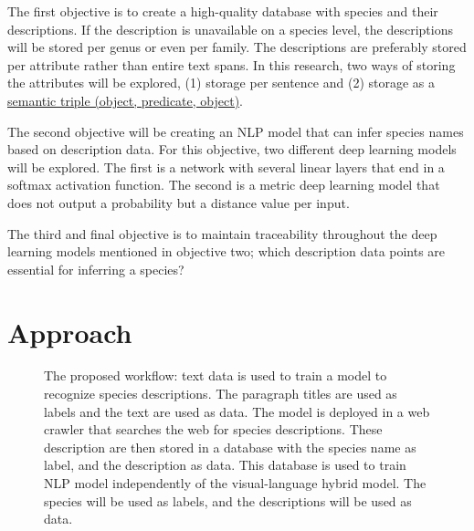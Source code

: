 \documentclass[a4paper, 12pt, oneside]{book} %
\begin{document}
The first objective is to create a high-quality database with species and their descriptions.
If the description is unavailable on a species level, the descriptions will be stored per genus or even per family.
The descriptions are preferably stored per attribute rather than entire text spans.
In this research, two ways of storing the attributes will be explored, (1) storage per sentence and (2) storage as a \href{https://www.ontotext.com/knowledgehub/fundamentals/what-is-a-knowledge-graph/}{semantic triple (object, predicate, object)}.

The second objective will be creating an NLP model that can infer species names based on description data. 
For this objective, two different deep learning models will be explored.
The first is a network with several linear layers that end in a softmax activation function.
The second is a metric deep learning model that does not output a probability but a distance value per input.

The third and final objective is to maintain traceability throughout the deep learning models mentioned in objective two; which description data points are essential for inferring a species?
\section{Approach} 
\thispagestyle{empty} %

\begin{figure} [t]
    \centering
    \vspace{-2cm}
    \caption{The proposed workflow: text data is used to train a model to recognize species descriptions. The paragraph titles are used as labels and the text are used as data. The model is deployed in a web crawler that searches the web for species descriptions. These description are then stored in a database with the species name as label, and the description as data. This database is used to train NLP model independently of the visual-language hybrid model. The species will be used as labels, and the descriptions will be used as data.}
    \label{fig:workflow}
\end{figure}
\end{document}
